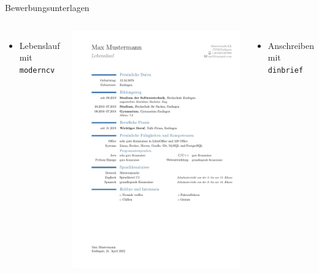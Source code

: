 \documentclass[presentation,aspectratio=169]{beamer}
\begin{document}
\begin{frame}[fragile]{Bewerbungsunterlagen}
  \begin{columns}
      \centering
      \begin{itemize}
        \item Lebenslauf mit \verb|moderncv|
      \end{itemize}
      \includegraphics[height=.7\textheight]{Lebenslauf}
      \centering
      \begin{itemize}
        \item Anschreiben mit \verb|dinbrief|
      \end{itemize}

\end{columns}
\end{frame}
\end{document}
